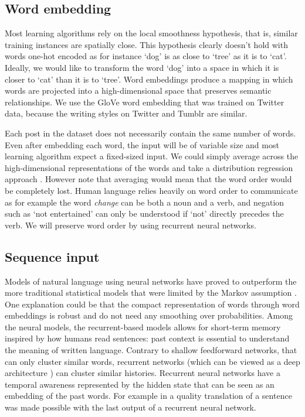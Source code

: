 \documentclass{article} %
\begin{document}
\subsection{Word embedding}
Most learning algorithms rely on the local smoothness hypothesis, that is, similar training instances are spatially close. This hypothesis clearly doesn't hold with words one-hot encoded as for instance `dog' is as close to `tree' as it is to `cat'. Ideally, we would like to transform the word `dog' into a space in which it is closer to `cat' than it is to `tree'. Word embeddings produce a mapping in which words are projected into a high-dimensional space that preserves semantic relationships. We use the GloVe \citep{Pennington-14} word embedding that was trained on Twitter data, because the writing styles on Twitter and Tumblr are similar.

Each post in the dataset does not necessarily contain the same number of words. Even after embedding each word, the input will be of variable size and most learning algorithm expect a fixed-sized input. We could simply average across the  high-dimensional representations of the words and take a distribution regression approach \citep{muandet2017kernel}. However note that averaging would mean that the word order would be completely lost. Human language relies heavily on word order to communicate as for example the word {\em change} can be both a noun and a verb, and negation such as `not entertained' can only be understood if `not' directly precedes the verb. We will preserve word order by using recurrent neural networks.

\subsection{Sequence input}
Models of natural language using neural networks have proved to outperform the more traditional statistical models that were limited by the Markov assumption \citep{Bengio-03,Goodman-01}. One explanation could be that the compact representation of words through word embeddings is robust \citep{Mikolov-11} and do not need any smoothing over probabilities. Among the neural models, the recurrent-based models allows for short-term memory inspired by how humans read sentences: past context is essential to understand the meaning of written language. Contrary to shallow feedforward networks, that can only cluster similar words, recurrent networks (which can be viewed as a deep architecture \citep{Bengio-07}) can cluster similar histories. 
Recurrent neural networks have a temporal awareness represented by the hidden state that can be seen as an embedding of the past words. For example in \citet{Sutskever-14} a quality translation of a sentence was made possible with the last output of a recurrent neural network.
\end{document}
